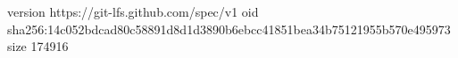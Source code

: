 version https://git-lfs.github.com/spec/v1
oid sha256:14c052bdcad80c58891d8d1d3890b6ebcc41851bea34b75121955b570e495973
size 174916

